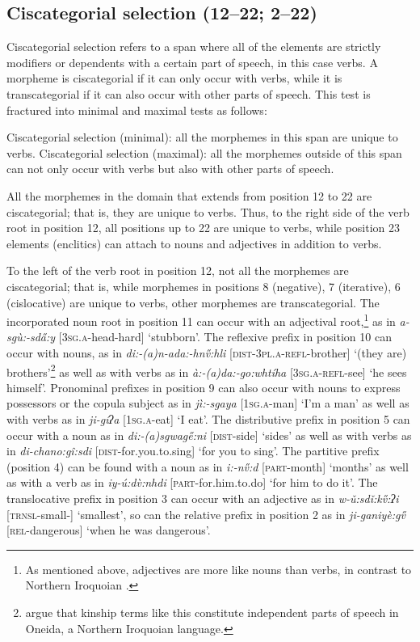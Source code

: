 \documentclass[output=paper]{langscibook}
\begin{document}
\subsection{Ciscategorial selection (12--22; 2--22)}
\label{bkm:Ref87350401}
Ciscategorial selection refers to a span where all of the elements are strictly modifiers or dependents with a certain part of speech, in this case verbs. A morpheme is ciscategorial if it can only occur with verbs, while it is transcategorial if it can also occur with other parts of speech. This test is fractured into minimal and maximal tests as follows:

\ea \label{ex:cher:key:54} Ciscategorial selection (minimal): all the morphemes in this span are unique to verbs. 
\z 
 \ea\label{ex:cher:key:55} Ciscategorial selection (maximal): all the morphemes outside of this span can not only occur with verbs but also with other parts of speech.
 \z

All the morphemes in the domain that extends from position 12 to 22 are ciscategorial; that is, they are unique to verbs. Thus, to the right side of the verb root in position 12, all positions up to 22 are unique to verbs, while position 23 elements (enclitics) can attach to nouns and adjectives in addition to verbs. 

To the left of the verb root in position 12, not all the morphemes are ciscategorial; that is, while morphemes in positions 8 (negative), 7 (iterative), 6 (cislocative) are unique to verbs, other morphemes are transcategorial. The incorporated noun root in position 11 can occur with an adjectival root,\footnote{As mentioned above, adjectives are more like nouns than verbs, in contrast to Northern Iroquoian \citep{Chafe2012}.}  as in \textit{a-sgù:-sd\H{a}:y} [\textsc{3sg.a}{}-head-hard] `stubborn'. The reflexive prefix in position 10 can occur with nouns, as in \textit{di:-(a)n-ada:-hn\H{v}:hli} [\textsc{dist-3pl.a-refl}{}-brother] `(they are) brothers'\footnote{\citet{Konig2010} argue that kinship terms like this constitute independent parts of speech in Oneida, a Northern Iroquoian language.}  as well as with verbs as in \textit{à:-(a)da:-go:whtíha} [\textsc{3sg.a-refl}{}-see] `he sees himself'. Pronominal prefixes in position 9 can also occur with nouns to express possessors or the copula subject as in \textit{jì:-sgaya} [\textsc{1sg.a}{}-man] `I'm a man' as well as with verbs as in \textit{ji-gíʔa} [\textsc{1sg.a}{}-eat] `I eat'. The distributive prefix in position 5 can occur with a noun as in \textit{di:-(a)sgwag\H{e}:ni} [\textsc{dist}{}-side] `sides' as well as with verbs as in \textit{di-chano:gî:sdi} [\textsc{dist}{}-for.you.to.sing] `for you to sing'. The partitive prefix (position 4) can be found with a noun as in \textit{i:-n\H{v}:d} [\textsc{part}{}-month] `months' as well as with a verb as in \textit{iy-ú:d\`{v}:nhdi} [\textsc{part}{}-for.him.to.do] `for him to do it'. The translocative prefix in position 3 can occur with an adjective as in \textit{w-ǔ:sdǐ:k\H{v}:ʔi} [\textsc{trnsl}{}-small-\Int{}] `smallest', so can the relative prefix in position 2 as in \textit{ji-ganiyè:gv̋ } [\textsc{rel}{}-dangerous] `when he was dangerous'. 
\end{document}
